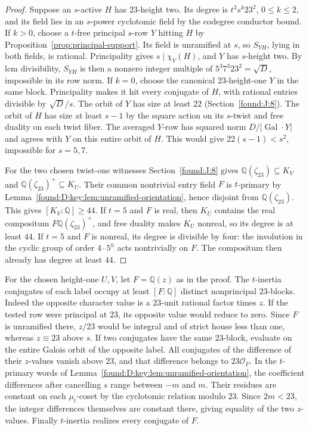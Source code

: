 \documentclass[11pt,a4paper]{article}
\numberwithin{equation}{section}
\theoremstyle{remark}
\newcommand{\QQ}{\mathbb Q}
\begin{document}
\begin{proof}
Suppose an $s$-active $H$ has $23$-height two. Its degree is $t^3s^k23^2$, $0\le k\le2$, and its field lies in an $s$-power cyclotomic field by the codegree conductor bound. If $k>0$, choose a $t$-free principal $s$-row $Y$ hitting $H$ by Proposition~\ref{prop:principal-support}. Its field is unramified at $s$, so $S_{YH}$, lying in both fields, is rational. Principality gives $s\mid\chi_Y(H)$, and $Y$ has $s$-height two. By lcm divisibility, $S_{YH}$ is then a nonzero integer multiple of $5^3 7^3 23^2=\sqrt D$, impossible in its row norm. If $k=0$, choose the canonical $23$-height-one $Y$ in the same block. Principality makes it hit every conjugate of $H$, with rational entries divisible by $\sqrt D/s$. The orbit of $Y$ has size at least $22$ (Section~\ref{found:J:8}). The orbit of $H$ has size at least $s-1$ by the square action on its $s$-twist and free duality on each twist fiber. The averaged $Y$-row has squared norm $D/|\operatorname{Gal}\cdot Y|$ and agrees with $Y$ on this entire orbit of $H$. This would give $22(s-1)<s^2$, impossible for $s=5,7$.

For the two chosen twist-one witnesses Section~\ref{found:J:8} gives $\QQ(\zeta_{23})\subseteq K_V$ and $\QQ(\zeta_{23})^+\subseteq K_U$. Their common nontrivial entry field $F$ is $t$-primary by Lemma~\ref{found:D:key:lem:unramified-orientation}, hence disjoint from $\QQ(\zeta_{23})$. This gives $[K_V:\QQ]\ge44$. If $t=5$ and $F$ is real, then $K_U$ contains the real compositum $F\QQ(\zeta_{23})^+$, and free duality makes $K_U$ nonreal, so its degree is at least $44$. If $t=5$ and $F$ is nonreal, its degree is divisible by four: the involution in the cyclic group of order $4\cdot5^h$ acts nontrivially on $F$. The compositum then already has degree at least $44$.
\end{proof}

For the chosen height-one $U,V$, let $F=\QQ(z)$ as in the proof. The $t$-inertia conjugates of each label occupy at least $[F:\QQ]$ distinct nonprincipal $23$-blocks. Indeed the opposite character value is a $23$-unit rational factor times $z$. If the tested row were principal at $23$, its opposite value would reduce to zero. Since $F$ is unramified there, $z/23$ would be integral and of strict house less than one, whereas $z\equiv23$ above $s$. If two conjugates have the same $23$-block, evaluate on the entire Galois orbit of the opposite label. All conjugates of the difference of their $z$-values vanish above $23$, and that difference belongs to $23\mathcal O_F$. In the $t$-primary words of Lemma~\ref{found:D:key:lem:unramified-orientation}, the coefficient differences after cancelling $s$ range between $-m$ and $m$. Their residues are constant on each $\mu_t$-coset by the cyclotomic relation modulo $23$. Since $2m<23$, the integer differences themselves are constant there, giving equality of the two $z$-values. Finally $t$-inertia realizes every conjugate of $F$.
\end{document}
